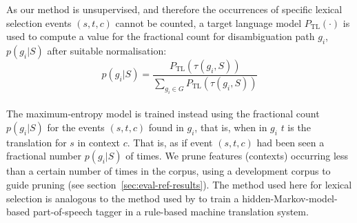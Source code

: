 \documentclass[11pt]{article}
\newcommand{\comment}[1]{\todo{#1}}
\begin{document}
As our method is unsupervised, and therefore the occurrences of
specific lexical selection events \((s,t,c)\) cannot be counted, a
target language model \(P_\mathrm{TL}(\cdot)\) is used to compute a value for
the fractional count for disambiguation path \(g_i\), $p(g_i|S)$ after
suitable normalisation:
\begin{equation}
 \label{eq:normalising}
   p(g_i|S) = \frac{P_\mathrm{TL}(\tau(g_i,S))}{\sum_{g_i \in G} P_\mathrm{TL}(\tau(g_i,S))}
\end{equation}
~\\
The maximum-entropy model is trained instead using the fractional
count $p(g_i|S)$ for the events $(s,t,c)$ found in \(g_i\), that is,
when in \(g_i\) $t$ is the translation for \(s\) in context
\(c\). That is, as if event $(s,t,c)$ had been seen a fractional
number $p(g_i|S)$ of times. We prune features (contexts)
 occurring less than a certain number of
times in the corpus, using a development corpus to guide pruning (see
section~\ref{sec:eval-ref-results}).
The method used here for lexical selection is analogous to the method
used by \cite{sanchez08b} to train a hidden-Markov-model-based
part-of-speech tagger in a rule-based machine translation system.
% 
\end{document}
